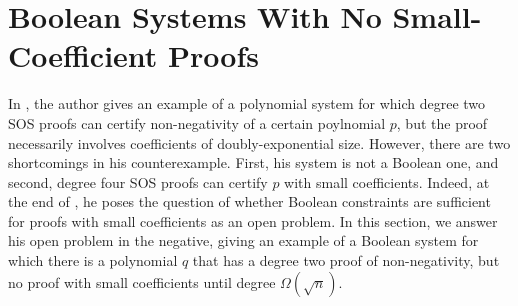 \section{Boolean Systems With No Small-Coefficient Proofs}\label{sec:counterexample}
In \cite{odonnel}, the author gives an example of a polynomial system for which degree two SOS proofs can certify non-negativity of a certain poylnomial $p$, but the proof necessarily involves coefficients of doubly-exponential size. However, there are two shortcomings in his counterexample. First, his system is not a Boolean one, and second, degree four SOS proofs can certify $p$ with small coefficients. Indeed, at the end of \cite{odonnel}, he poses the question of whether Boolean constraints are sufficient for proofs with small coefficients as an open problem. In this section, we answer his open problem in the negative, giving an example of a Boolean system for which there is a polynomial $q$ that has a degree two proof of non-negativity, but no proof with small coefficients until degree $\Omega(\sqrt{n})$.

